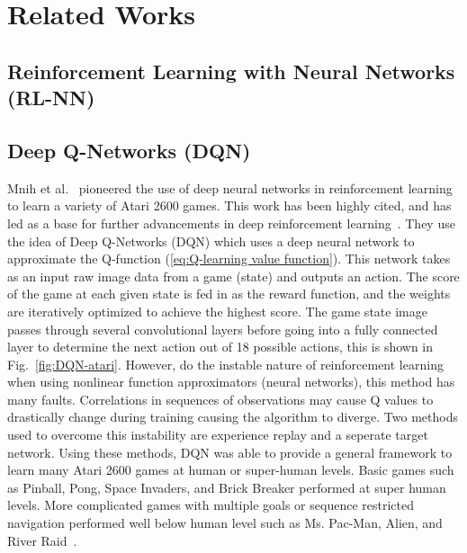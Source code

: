 \documentclass[12pt,american]{report}
\begin{document}
\section{Related Works}

\subsection{Reinforcement Learning with Neural Networks (RL-NN)}

\subsection{Deep Q-Networks (DQN)}
\label{sec:dqn}
Mnih et al.~\cite{atari} pioneered the use of deep neural networks in reinforcement learning to learn a variety of Atari 2600 games.  This work has been highly cited, and has led as a base for further advancements in deep reinforcement learning~\cite{atari}.  They use the idea of Deep Q-Networks (DQN) which uses a deep neural network to approximate the Q-function (\ref{eq:Q-learning value function}). This network takes as an input raw image data from a game (state) and outputs an action. The score of the game at each given state is fed in as the reward function, and the weights are iteratively optimized to achieve the highest score. The game state image passes through several convolutional layers before going into a fully connected layer to determine the next action out of 18 possible actions, this is shown in Fig.~\ref{fig:DQN-atari}. However, do the instable nature of reinforcement learning when using nonlinear function approximators (neural networks), this method has many faults. Correlations in sequences of observations may cause Q values to drastically change during training causing the algorithm to diverge. Two methods used to overcome this instability are experience replay and a seperate target network. Using these methods, DQN was able to provide a general framework to learn many Atari 2600 games at human or super-human levels. Basic games such as Pinball, Pong, Space Invaders, and Brick Breaker performed at super human levels. More complicated games with multiple goals or sequence restricted navigation performed well below human level such as Ms. Pac-Man, Alien, and River Raid~\cite{atari}.
\end{document}
